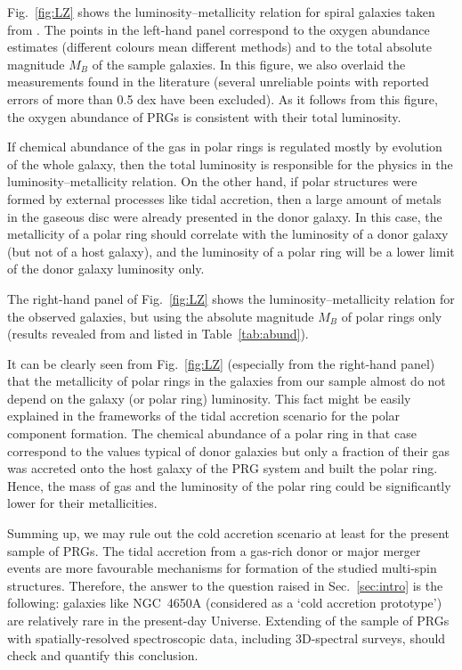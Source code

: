 \documentclass[useAMS,usenatbib]{mnras}
\begin{document}
Fig.~\ref{fig:LZ}  shows the luminosity--metallicity relation for spiral galaxies taken from \citet{Pilyugin2004}. The points in the left-hand panel correspond to the oxygen abundance estimates (different colours mean different methods) and to the total absolute magnitude $M_B$ of the sample galaxies. In this figure, we also overlaid the measurements found in the literature (several unreliable points with reported errors of more than 0.5 dex have been excluded). As it follows from this figure, the oxygen abundance of PRGs is consistent with their total luminosity.
	 
If chemical abundance of the gas in polar rings is regulated mostly by evolution of the whole galaxy, then the total luminosity is responsible for  the physics in the luminosity--metallicity relation. On the other hand, if polar structures were formed by external processes like tidal accretion, then a large amount of metals in the gaseous disc were already presented in the donor galaxy. In this case, the metallicity of a polar ring should correlate with the luminosity of a donor galaxy (but not of a host galaxy), and  the luminosity of a polar ring will be a lower limit of the donor galaxy luminosity only.

The right-hand panel of Fig.~\ref{fig:LZ} shows the luminosity--metallicity relation for the observed galaxies, but using the absolute magnitude $M_B$ of polar rings only (results revealed from \citealt{Reshetnikov2015} and listed in Table~\ref{tab:abund}).
	
It can be clearly seen from Fig.~\ref{fig:LZ} (especially from the right-hand panel) that the metallicity of polar rings in the galaxies from our sample almost do not depend on the galaxy (or polar ring) luminosity. This fact might be easily explained in the frameworks of the tidal accretion scenario for the polar component formation. The chemical abundance of a polar ring in that case correspond to the values typical of donor galaxies but only a fraction of their gas was accreted onto the host galaxy of the PRG system and built the polar ring. Hence, the mass of gas and the luminosity of the polar ring could be significantly lower for their metallicities.
	
Summing up, we may rule out the cold accretion scenario  at least for the present sample of PRGs. The tidal accretion from a gas-rich donor or  major merger events are more favourable mechanisms for formation of the studied multi-spin structures. Therefore, the answer to the question raised in Sec.~\ref{sec:intro} is the following:  galaxies like NGC~4650A (considered as a `cold accretion prototype') are relatively rare  in the  present-day Universe. Extending of the sample of PRGs with spatially-resolved spectroscopic data, including 3D-spectral  surveys,  should check and quantify this conclusion.
\end{document}
